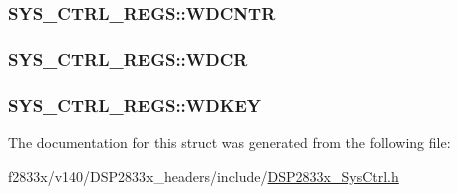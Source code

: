\subsubsection[{W\+D\+C\+N\+T\+R}]{ S\+Y\+S\+\_\+\+C\+T\+R\+L\+\_\+\+R\+E\+G\+S\+::\+W\+D\+C\+N\+T\+R}\label{struct_s_y_s___c_t_r_l___r_e_g_s_a92b24af23d12a6923e477f4468b839e2}
\hypertarget{struct_s_y_s___c_t_r_l___r_e_g_s_a3ceb4cad7e7068a2872a2d50c647745c}{}
\subsubsection[{W\+D\+C\+R}]{ S\+Y\+S\+\_\+\+C\+T\+R\+L\+\_\+\+R\+E\+G\+S\+::\+W\+D\+C\+R}\label{struct_s_y_s___c_t_r_l___r_e_g_s_a3ceb4cad7e7068a2872a2d50c647745c}
\hypertarget{struct_s_y_s___c_t_r_l___r_e_g_s_a1ed06323c33e1bba4a06aaf56186286a}{}
\subsubsection[{W\+D\+K\+E\+Y}]{ S\+Y\+S\+\_\+\+C\+T\+R\+L\+\_\+\+R\+E\+G\+S\+::\+W\+D\+K\+E\+Y}\label{struct_s_y_s___c_t_r_l___r_e_g_s_a1ed06323c33e1bba4a06aaf56186286a}


The documentation for this struct was generated from the following file\+:\begin{DoxyCompactItemize}
\item 
f2833x/v140/\+D\+S\+P2833x\+\_\+headers/include/\hyperlink{_d_s_p2833x___sys_ctrl_8h}{D\+S\+P2833x\+\_\+\+Sys\+Ctrl.\+h}\end{DoxyCompactItemize}
